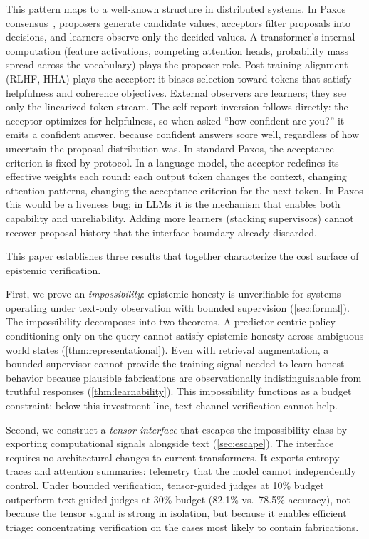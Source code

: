 This pattern maps to a well-known structure in distributed
systems. In Paxos consensus~\cite{paxos}, proposers generate candidate
values, acceptors filter proposals into decisions, and learners observe
only the decided values. A transformer's internal computation (feature
activations, competing attention heads, probability mass spread across the
vocabulary) plays the proposer role. Post-training alignment (RLHF, HHA)
plays the acceptor: it biases selection toward tokens that satisfy
helpfulness and coherence objectives. External observers are learners; they
see only the linearized token stream. The self-report inversion follows
directly: the acceptor optimizes for helpfulness, so when asked ``how
confident are you?'' it emits a confident answer, because confident answers
score well, regardless of how uncertain the proposal distribution was. In
standard Paxos, the acceptance criterion is fixed by protocol. In a
language model, the acceptor redefines its effective weights each round:
each output token changes the context, changing attention patterns, changing
the acceptance criterion for the next token. In Paxos this would be a
liveness bug; in LLMs it is the mechanism that enables both capability and
unreliability. Adding more learners (stacking supervisors) cannot recover
proposal history that the interface boundary already discarded.


This paper establishes three results that together characterize the cost
surface of epistemic verification.

First, we prove an \emph{impossibility}: epistemic honesty is unverifiable
for systems operating under text-only observation with bounded supervision
(\autoref{sec:formal}). The impossibility decomposes into two theorems. A
predictor-centric policy conditioning only on the query cannot satisfy
epistemic honesty across ambiguous world states
(\autoref{thm:representational}). Even with retrieval augmentation, a
bounded supervisor cannot provide the training signal needed to learn
honest behavior because plausible fabrications are observationally
indistinguishable from truthful responses (\autoref{thm:learnability}).
This impossibility functions as a budget constraint: below this investment
line, text-channel verification cannot help.

Second, we construct a \emph{tensor interface} that escapes the
impossibility class by exporting computational signals alongside text
(\autoref{sec:escape}). The interface requires no architectural changes to
current transformers. It exports entropy traces and attention
summaries: telemetry that the model cannot independently control. Under
bounded verification, tensor-guided judges at 10\% budget outperform
text-guided judges at 30\% budget (82.1\% vs.\ 78.5\% accuracy), not
because the tensor signal is strong in isolation, but because it enables
efficient triage: concentrating verification on the cases most likely to
contain fabrications.

